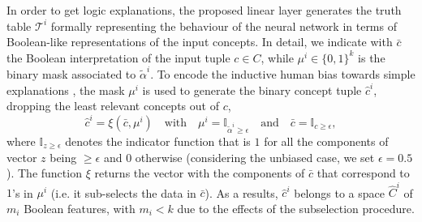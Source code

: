 \documentclass[withindex,glossary]{cam-thesis}
\theoremstyle{plain}
\theoremstyle{definition}
\theoremstyle{remark}
\begin{document}
In order to %
get logic explanations, the proposed linear layer generates the truth table $\mathcal{T}^i$ formally representing the behaviour of the neural network 
in terms of Boolean-like representations of the input concepts. %
In detail, we indicate with $\bar{c}$ the Boolean interpretation of the input tuple $c \in C$, while $\mu^i \in \{0,1\}^k$ is the binary mask associated to $\tilde{\alpha}^i$.
To encode the inductive human bias towards simple explanations \citep{miller1956magical,cowan2001magical,ma2014changing}, the 
mask %
$\mu^i$
is used to generate the 
binary %
concept tuple $\hat{c}^i$, 
dropping %
the least relevant concepts out of $c$,
\begin{equation}\label{eq:sparse}
    \hat{c}^i = \xi(\bar{c}, \mu^i)  \quad \text{with} \quad
    \mu^i = \mathbb{I}_{\tilde{\alpha}^i \geq \epsilon} \quad \text{and} \quad \bar{c} = \mathbb{I}_{c \geq \epsilon},
\end{equation}
where $\mathbb{I}_{z \geq \epsilon}$ denotes the indicator function that is $1$ for all the components of vector $z$ being $\geq \epsilon$ and $0$ otherwise (considering the unbiased case, we set $\epsilon=0.5$).
The function $\xi$ returns the vector with the components of $\bar{c}$ that correspond to $1$'s in $\mu^i$ (i.e. it sub-selects the data in $\bar{c}$).
As a results, $\hat{c}^i$ belongs to a space $\hat{C}^i$ of $m_i$ Boolean features, with $m_i < k$ due to the effects of the subselection procedure.
\end{document}
